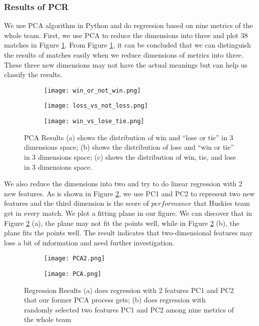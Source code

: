 \documentclass[12pt]{mcmthesis}
\begin{document}
\subsubsection{Results of PCR}
	We use PCA algorithm in Python and do regression based on nine metrics of the whole team. First, we use PCA to reduce the dimensions into three and plot 38 matches in Figure \ref{fig:pca}. From Figure \ref{fig:pca}, it can be concluded that we can distinguish the results of matches easily when we reduce dimensions of metrics into three. These three new dimensions may not have the actual meanings but can help us classify the results.
	\begin{figure}[h]
		\centering 
		\begin{subfigure}[b]{0.32\textwidth}
			\texttt{[image: win\_or\_not\_win.png]}
			\caption{}
		\end{subfigure}
		\begin{subfigure}[b]{0.32\textwidth}
			\texttt{[image: loss\_vs\_not\_loss.png]}
			\caption{}
		\end{subfigure}
		\begin{subfigure}[b]{0.32\textwidth}
			\texttt{[image: win\_vs\_lose\_tie.png]}
			\caption{}
		\end{subfigure}
	\caption{PCA Results (a) shows the distribution of win and ``lose or tie'' in 3 dimensions space; (b) shows the distribution of lose and ``win or tie'' in 3 dimensions space; (c) shows the distribution of win, tie, and lose in 3 dimensions space.}
	\label{fig:pca}
	\end{figure}

	We also reduce the dimensions into two and try to do linear regression with 2 new features. As is shown in Figure \ref{fig:regression}, we use PC1 and PC2 to represent two new features and the third dimension is the score of $performance$ that Huskies team get in every match. We plot a fitting plane in our figure. We can discover that in Figure \ref{fig:regression} (a), the plane may not fit the points well, while in Figure \ref{fig:regression} (b), the plane fits the points well. The result indicates that two-dimensional features may lose a bit of information and need further investigation.
	\begin{figure}[h]
		\centering
		\begin{subfigure}[b]{0.4\textwidth}
			\texttt{[image: PCA2.png]}
			\caption{}
		\end{subfigure}
		\begin{subfigure}[b]{0.4\textwidth}
			\texttt{[image: PCA.png]}
			\caption{}
		\end{subfigure}
	\caption{Regression Results (a) does regression with 2 features PC1 and PC2 that our former PCA  process gets; (b) does regression with randomly selected two features PC1 and PC2 among nine metrics of the whole team}
	\label{fig:regression}
	\end{figure}
\end{document}
